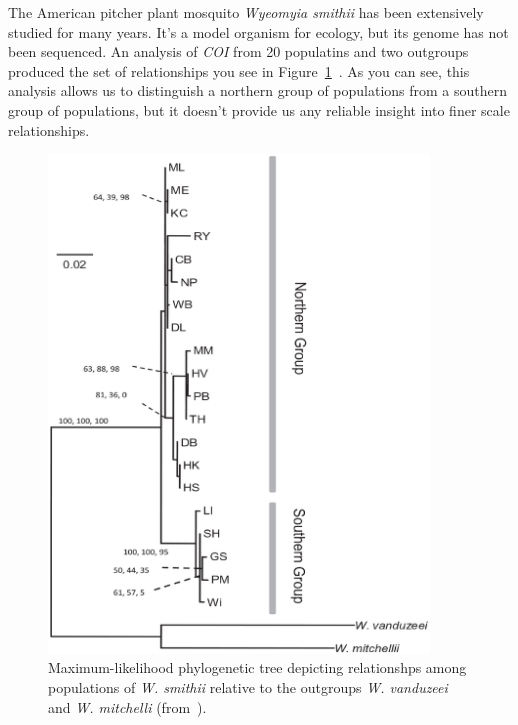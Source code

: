 The American pitcher plant mosquito {\it Wyeomyia
  smithii\/} has been extensively studied for many years. It's a model
organism for ecology, but its genome has not been sequenced. An
analysis of {\it COI} from 20 populatins and two outgroups produced
the set of relationships you see in
Figure~\ref{fig:wyeomyia-COI}~\cite{Emerson-etal-2010}.
As you can see, this analysis allows us to distinguish a northern
group of populations from a southern group of populations, but it
doesn't provide us any reliable insight into finer scale
relationships. 

\begin{figure}
\begin{center}
\includegraphics[width=0.9\textwidth]{wyeomyia-COI.eps}
\end{center}
\caption{Maximum-likelihood phylogenetic tree depicting relationshps
  among populations of {\it W. smithii\/} relative to the outgroups
  {\it W. vanduzeei\/} and {\it W. mitchelli} (from~\cite{Emerson-etal-2010}).}\label{fig:wyeomyia-COI}
\end{figure}

